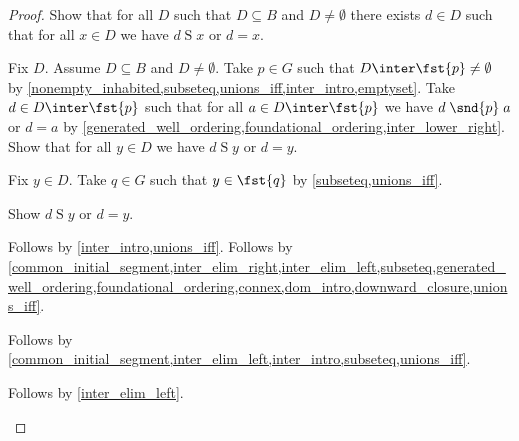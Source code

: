\begin{proof}
    Show that for all $D$ such that $D\subseteq B$ and $D\neq\emptyset$
        there exists $d\in D$ such that for all $x\in D$ we have $d\mathrel{S}x$ or $d=x$.
    \begin{subproof}
        Fix $D$.
        Assume $D\subseteq B$ and $D\neq\emptyset$.
        Take $p\in G$ such that $D\inter\fst{p}\neq\emptyset$
            by \cref{nonempty_inhabited,subseteq,unions_iff,inter_intro,emptyset}.
        Take $d\in D\inter\fst{p}$ such that for all $a\in D\inter\fst{p}$
            we have $d\mathrel{\snd{p}}a$ or $d=a$
            by \cref{generated_well_ordering,foundational_ordering,inter_lower_right}.
        Show that for all $y\in D$ we have $d\mathrel{S}y$ or $d=y$.
        \begin{subproof}
            Fix $y\in D$.
            Take $q\in G$ such that $y\in\fst{q}$ by \cref{subseteq,unions_iff}.
            \begin{byCase}
                Show $d\mathrel{S}y$ or $d=y$.
                \begin{subproof}
                    \begin{byCase}
                        Follows by \cref{inter_intro,unions_iff}.
                        Follows by \cref{common_initial_segment,inter_elim_right,inter_elim_left,subseteq,generated_well_ordering,foundational_ordering,connex,dom_intro,downward_closure,unions_iff}.
                    \end{byCase}
                \end{subproof}
                Follows by \cref{common_initial_segment,inter_elim_left,inter_intro,subseteq,unions_iff}.
            \end{byCase}
        \end{subproof}
        Follows by \cref{inter_elim_left}.
    \end{subproof}


\end{proof}
